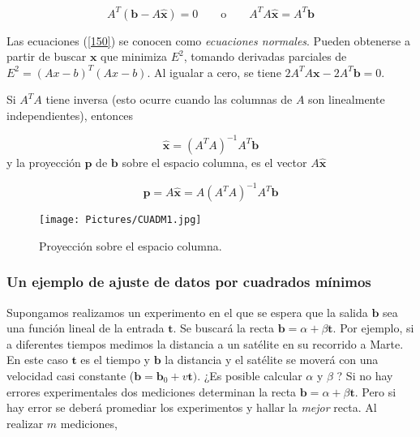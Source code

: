 {\begin{equation}
  A^T(\textbf{b}-A \hat{\textbf{x}})=0 \qquad  \text{o}  \qquad    A^TA  \hat{\textbf{x}}=A^T\textbf{b}
  \label{150}
\end{equation}

Las ecuaciones (\ref{150}) se conocen como \textit{ecuaciones normales}. Pueden obtenerse a partir de buscar  $\textbf{x}$ que minimiza $E^2$, tomando derivadas parciales de $E^2= (Ax-b)^T(Ax-b)$. Al igualar a cero,   se tiene $2A^TA\textbf{x}-2A^T\textbf{b}=0$.


Si $A^TA$ tiene inversa (esto ocurre cuando las columnas de $A$ son linealmente independientes), entonces 

\begin{equation}
  \hat {\textbf{x}}=  (A^T A)^{-1}A^T\textbf{b}
  \label{160}
\end{equation}
y la proyección $\textbf{p}$ de $\textbf{b}$ sobre el espacio columna, es el vector $A \hat{\textbf{x}}$

\begin{equation}
  \textbf{p}= A \hat{\textbf{x}}= A (A^T A)^{-1}A^T \textbf{b}
  \label{170}
\end{equation}

\begin{figure}
    \centering
    \texttt{[image: Pictures/CUADM1.jpg]}
    \caption{Proyección sobre el espacio columna.}
    \label{MINCUAD_1}
\end{figure}

\subsubsection{Un ejemplo de ajuste de datos  por  cuadrados mínimos}

Supongamos realizamos un experimento en el que se espera que la salida $\textbf{b}$ sea una función lineal de la entrada $\textbf{t}$. Se buscará la recta $\textbf{b}= \alpha + \beta \textbf{t}$. Por ejemplo, si a diferentes tiempos medimos la distancia a un satélite en su recorrido a Marte. En este caso $\textbf{t}$ es el tiempo y $\textbf{b}$ la distancia y el satélite se moverá con una velocidad casi constante ($\textbf{b}=\textbf{b}_0 + v \textbf{t})$. 
¿Es posible calcular $\alpha$ y $\beta$ ? Si no hay errores experimentales dos mediciones determinan la recta $\textbf{b}= \alpha + \beta \textbf{t}$. Pero si hay error  se deberá promediar los experimentos y hallar la \textit{mejor} recta.
Al realizar $m$ mediciones, 

}
